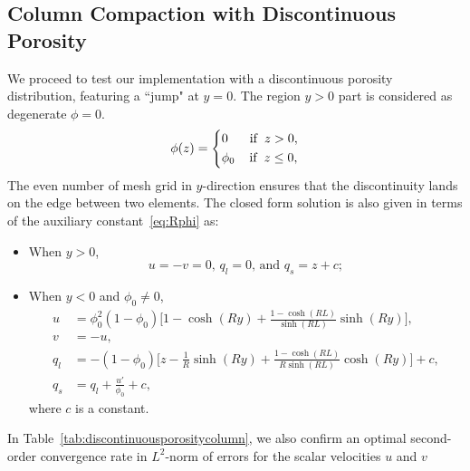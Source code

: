 \subsection{Column Compaction with Discontinuous Porosity}
We proceed to test our implementation with a discontinuous porosity distribution, 
featuring a ``jump" at $y=0$. 
The region $y>0$ part is considered as degenerate $\phi = 0$.
					 \begin{equation}\label{eq:phidiscon}
								\phi(z) = \left \{
										  \begin{aligned}
													 &0 \hspace{0.6cm} \text{if}\hspace{0.2cm}  z> 0,\\
													 &\phi_0 \hspace{0.4cm} \text{if}\hspace{0.2cm} z\leq 0,
										  \end{aligned}
										  \right.
					 \end{equation}
The even number of mesh grid in $y$-direction ensures that the discontinuity lands on the edge between two elements.
					 The closed form solution is also given in terms of the auxiliary constant~\eqref{eq:Rphi} as:
					 \begin{itemize}
								\item When $y>0$,
										  \begin{equation*}
										  u=-v=0,
													 \, q_l = 0,\,\text{and}\,\, q_s = z + c;
										  \end{equation*}
								\item When $y<0$ and $\phi_0 \neq 0$,
					 \begin{equation*}
								\begin{aligned}
										  u &= \phi_0^2(1-\phi_0) \bigg[1 - \cosh(Ry) + \frac{1 - \cosh{(RL)}}{\sinh{(RL)}}\sinh{(Ry)} \bigg],\\
								 v &= -u, \\
										  q_l &= -(1-\phi_0)\bigg[z - \frac{1}{R}\sinh(Ry) + \frac{1-\cosh(RL)}{R\sinh(RL)}\cosh(Ry)\bigg] + c,\\
										  q_s &= q_l + \frac{u'}{\phi_0} + c,
								\end{aligned}
					 \end{equation*}
                where $c$ is a constant.
                \end{itemize}
In Table~\ref{tab:discontinuousporositycolumn},  
we also confirm an 
optimal second-order convergence rate in $L^2$-norm of errors for the scalar velocities $u$ and $v$ 
